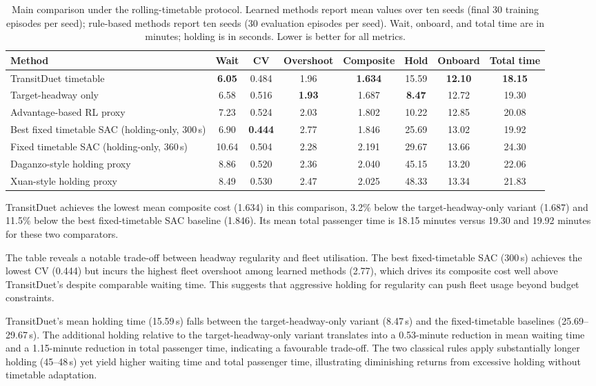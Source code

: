 \begin{table}[H]
\centering
\caption{Main comparison under the rolling-timetable protocol. Learned methods report mean values over ten seeds (final 30 training episodes per seed); rule-based methods report ten seeds (30 evaluation episodes per seed). Wait, onboard, and total time are in minutes; holding is in seconds. Lower is better for all metrics.}
\label{tab:main_results}
\scriptsize
\setlength{\tabcolsep}{2.2pt}
\begin{tabular}{@{}lccccccc@{}}
\toprule
Method & Wait & CV & Overshoot & Composite & Hold & Onboard & Total time \\
\midrule
TransitDuet timetable & \textbf{6.05} & 0.484 & 1.96 & \textbf{1.634} & 15.59 & \textbf{12.10} & \textbf{18.15} \\
Target-headway only & 6.58 & 0.516 & \textbf{1.93} & 1.687 & \textbf{8.47} & 12.72 & 19.30 \\
Advantage-based RL proxy & 7.23 & 0.524 & 2.03 & 1.802 & 10.22 & 12.85 & 20.08 \\
Best fixed timetable SAC (holding-only, 300\,s) & 6.90 & \textbf{0.444} & 2.77 & 1.846 & 25.69 & 13.02 & 19.92 \\
Fixed timetable SAC (holding-only, 360\,s) & 10.64 & 0.504 & 2.28 & 2.191 & 29.67 & 13.66 & 24.30 \\
Daganzo-style holding proxy & 8.86 & 0.520 & 2.36 & 2.040 & 45.15 & 13.20 & 22.06 \\
Xuan-style holding proxy & 8.49 & 0.530 & 2.47 & 2.025 & 48.33 & 13.34 & 21.83 \\
\bottomrule
\end{tabular}
\end{table}

TransitDuet achieves the lowest mean composite cost (1.634) in this comparison, 3.2\% below the target-headway-only variant (1.687) and 11.5\% below the best fixed-timetable SAC baseline (1.846). Its mean total passenger time is 18.15 minutes versus 19.30 and 19.92 minutes for these two comparators.

The table reveals a notable trade-off between headway regularity and fleet utilisation. The best fixed-timetable SAC (300\,s) achieves the lowest CV (0.444) but incurs the highest fleet overshoot among learned methods (2.77), which drives its composite cost well above TransitDuet's despite comparable waiting time. This suggests that aggressive holding for regularity can push fleet usage beyond budget constraints.

TransitDuet's mean holding time (15.59\,s) falls between the target-headway-only variant (8.47\,s) and the fixed-timetable baselines (25.69--29.67\,s). The additional holding relative to the target-headway-only variant translates into a 0.53-minute reduction in mean waiting time and a 1.15-minute reduction in total passenger time, indicating a favourable trade-off. The two classical rules apply substantially longer holding (45--48\,s) yet yield higher waiting time and total passenger time, illustrating diminishing returns from excessive holding without timetable adaptation.

